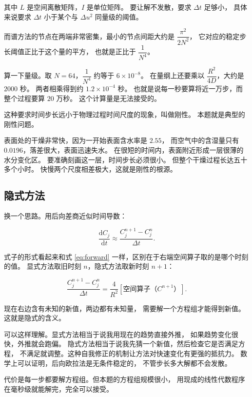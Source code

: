 其中 $L$ 是空间离散矩阵，$I$ 是单位矩阵。
要让解不发散，要求 $\Delta t$ 足够小，
具体来说要求 $\Delta t$ 小于某个与 $\Delta u^2$ 同量级的阈值。

而谱方法的节点在两端非常密集，最小的节点间距大约是 $\dfrac{\pi^2}{2N^2}$，
它对应的稳定步长阈值正比于这个量的平方，
也就是正比于 $\dfrac{1}{N^4}$。

算一下量级。取 $N=64$，$\dfrac{1}{N^4}$ 约等于 $6\times10^{-8}$。
在量纲上还要乘以 $\dfrac{R^2}{4D}$，大约是 $2000$ 秒。
两者相乘得到约 $1.2\times10^{-4}$ 秒。
也就是说每一秒要算将近一万步，而整个过程要算 $20$ 万秒。
这个计算量是无法接受的。

这种要求时间步长远小于物理过程时间尺度的现象，叫做刚性。
本题就是典型的刚性问题。

表面处的干燥非常快，因为一开始表面含水率是 $2.55$，
而空气中的含湿量只有 $0.0196$，落差很大，表面迅速失水。
在很短的时间内，表面附近形成一层很薄的水分变化区。
要准确刻画这一层，时间步长必须很小。
但整个干燥过程长达五十多个小时。
快慢两个尺度相差极大，这就是刚性的根源。

\subsection{隐式方法}

换一个思路。用后向差商近似时间导数：

\begin{equation}
\frac{\mathrm{d}C_j}{\mathrm{d}t}\approx\frac{C_j^{n+1}-C_j^{n}}{\Delta t}.
\end{equation}

式子的形式看起来和式 \eqref{eq:forward} 一样，区别在于右端空间算子取的是哪个时刻的值。
显式方法取旧时刻 $n$，隐式方法取新时刻 $n+1$：

\begin{equation}
\frac{C_j^{n+1}-C_j^{n}}{\Delta t}
= \frac{4}{R^2}\left[\text{空间算子}（C^{n+1}）\right].
\label{eq:implicit}
\end{equation}

现在右边含有未知的新值，两边都有未知量，
需要解一个方程组才能得到新值。这就是隐式的含义。

可以这样理解。显式方法相当于说我用现在的趋势直接外推，
如果趋势变化很快，外推就会跑偏。
隐式方法相当于说我先猜一个新值，然后检查它是否满足方程，
不满足就调整。这种自我修正的机制让方法对快速变化有更强的抵抗力。
数学上可以证明，后向欧拉法是无条件稳定的，
不管步长多大解都不会发散。

代价是每一步都要解方程组。但本题的方程组规模很小，
用现成的线性代数程序在毫秒级就能解完，完全可以接受。

